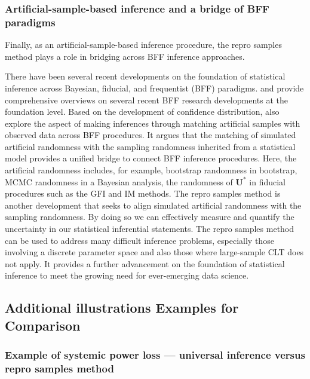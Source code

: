 \documentclass[12pt]{article}
\theoremstyle{shortspace}
\def\*#1{\bm{#1}}
\begin{document}
\subsubsection
{Artificial-sample-based inference and a bridge of BFF paradigms} 

Finally, as an artificial-sample-based inference procedure, the repro samples method plays a role in bridging across BFF inference approaches. 

There have been several recent developments on the foundation of statistical inference across Bayesian, fiducial, and frequentist (BFF) paradigms. \cite{Reid2022} and \cite{Thornton2022} provide comprehensive overviews on several recent BFF research developments at the foundation level. Based on the development of confidence distribution,  \cite{Thornton2022} also explore the aspect of making inferences through matching artificial samples with observed data across BFF procedures. It argues that the matching of simulated artificial randomness with the sampling randomness inherited from a statistical model provides a unified
bridge to connect BFF inference procedures.
Here, the artificial randomness includes, for example, bootstrap randomness in bootstrap, MCMC randomness in a Bayesian analysis, the randomness of $\*U^*$ in fiducial procedures such as the 
GFI and IM methods. 
The repro samples method is another development that seeks to align simulated artificial randomness with the sampling randomness. By doing so we can effectively measure and quantify the uncertainty in our statistical inferential statements. 
The repro samples method can be used to address many difficult inference problems, especially those involving a discrete parameter space and also those where large-sample CLT does not apply. It provides a further advancement on the foundation of statistical inference to meet the growing need for ever-emerging data science. 


\subsection{Additional illustrations Examples for Comparison}\label{sec:comp_additional_example}


\subsubsection{Example of systemic power loss ---  universal inference versus repro samples method} 
\label{sec:universal-power-loss}
\end{document}
